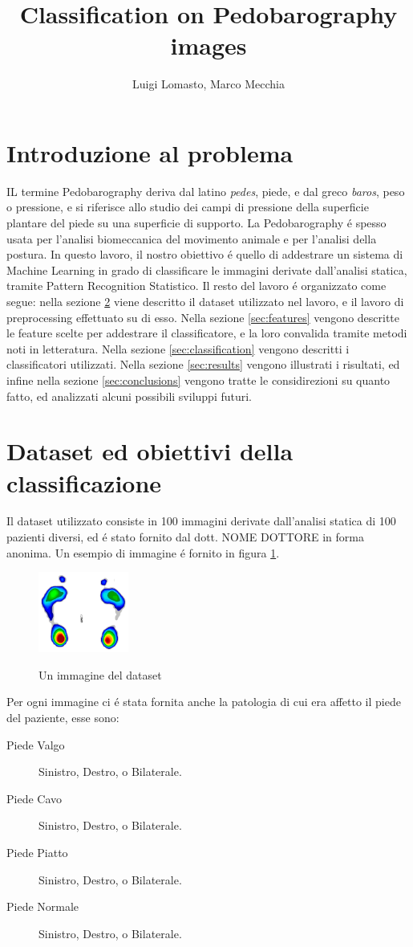 \documentclass[11pt,twoside,a4paper]{article}
\begin{document}
\title{Classification on Pedobarography images}
\author{Luigi Lomasto, Marco Mecchia} 
\maketitle
\section{Introduzione al problema}
IL termine Pedobarography deriva dal latino \emph{pedes}, piede, e dal greco \emph{baros}, peso o pressione, e si riferisce allo studio dei campi di pressione della superficie plantare del piede su una superficie di supporto. La Pedobarography \'e spesso usata per l'analisi biomeccanica del movimento animale e per l'analisi della postura. In questo lavoro, il nostro obiettivo \'e quello di addestrare un sistema di Machine Learning in grado di classificare le immagini derivate dall'analisi statica, tramite Pattern Recognition Statistico.
Il resto del lavoro \'e organizzato come segue: nella sezione \ref{sec:dataset} viene descritto il dataset utilizzato nel lavoro, e il lavoro di preprocessing effettuato su di esso. Nella sezione \ref{sec:features} vengono descritte le feature scelte per addestrare il classificatore, e la loro convalida tramite metodi noti in letteratura. Nella sezione \ref{sec:classification} vengono descritti i classificatori utilizzati. Nella sezione \ref{sec:results} vengono illustrati i risultati, ed infine nella sezione \ref{sec:conclusions} vengono tratte le considirezioni su quanto fatto, ed analizzati alcuni possibili sviluppi futuri.

\section{Dataset ed obiettivi della classificazione}
\label{sec:dataset}
Il dataset utilizzato consiste in 100 immagini derivate dall'analisi statica di 100 pazienti diversi, ed \'e stato fornito dal dott. NOME DOTTORE in forma anonima. Un esempio di immagine \'e fornito in figura \ref{fig:immagineEsempio}. 
\begin{figure}
\centering
\includegraphics[height=100px, keepaspectratio]{4.png}
\label{fig:immagineEsempio}
\caption{Un immagine del dataset}
\end{figure}
Per ogni immagine ci \'e stata fornita anche la patologia di cui era affetto il piede del paziente, esse sono:
\begin{description}
\item[Piede Valgo] Sinistro, Destro, o Bilaterale.
\item[Piede Cavo] Sinistro, Destro, o Bilaterale.
\item[Piede Piatto] Sinistro, Destro, o Bilaterale.
\item[Piede Normale] Sinistro, Destro, o Bilaterale.
\end{description}
\end{document}
